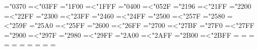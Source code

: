 \ifdefined\XeTeXinterchartoks
\newfontfamily{}
\newfontfamily{}
\newXeTeXintercharclass\hcclassletters
\newXeTeXintercharclass\hcclasssymbols
\makeatletter
\def\hc@range#1#2#3{\count@=#1\relax
  \loop\XeTeXcharclass\count@=#3\relax\ifnum\count@<#2\advance\count@\@ne\repeat}
\hc@range{"0370}{"03FF}{\hcclassletters}
\hc@range{"1F00}{"1FFF}{\hcclassletters}
\hc@range{"0400}{"052F}{\hcclassletters}
\hc@range{"2196}{"21FF}{\hcclasssymbols}
\hc@range{"2200}{"22FF}{\hcclasssymbols}
\hc@range{"2300}{"23FF}{\hcclasssymbols}
\hc@range{"2460}{"24FF}{\hcclasssymbols}
\hc@range{"2500}{"257F}{\hcclasssymbols}
\hc@range{"2580}{"259F}{\hcclasssymbols}
\hc@range{"25A0}{"25FF}{\hcclasssymbols}
\hc@range{"2600}{"26FF}{\hcclasssymbols}
\hc@range{"2700}{"27BF}{\hcclasssymbols}
\hc@range{"27F0}{"27FF}{\hcclasssymbols}
\hc@range{"2900}{"297F}{\hcclasssymbols}
\hc@range{"2980}{"29FF}{\hcclasssymbols}
\hc@range{"2A00}{"2AFF}{\hcclasssymbols}
\hc@range{"2B00}{"2BFF}{\hcclasssymbols}
\let\hc@close\relax
\def\hc@restore{\fontfamily{\hc@saved}\selectfont\let\hc@close\relax}
\def\hc@open#1{\hc@close
  \edef\hc@a{\f@family}\edef\hc@b{\ttdefault}%
  \ifx\hc@a\hc@b\else\let\hc@saved\hc@a\let\hc@close\hc@restore#1\fi}
 \hcclassletters = {\hc@open\hcfallbackletters}
 \hcclassletters = {\hc@open\hcfallbackletters}
\XeTeXinterchartoks \hcclasssymbols \hcclassletters = {\hc@open\hcfallbackletters}
 \hcclasssymbols = {\hc@open\hcfallbacksymbols}
 \hcclasssymbols = {\hc@open\hcfallbacksymbols}
\XeTeXinterchartoks \hcclassletters \hcclasssymbols = {\hc@open\hcfallbacksymbols}
\XeTeXinterchartoks {} = {\hc@close}
\XeTeXinterchartoks {} = {\hc@close}
\XeTeXinterchartoks {} = {\hc@close}
\XeTeXinterchartoks {} = {\hc@close}
\makeatother
{}
\fi
